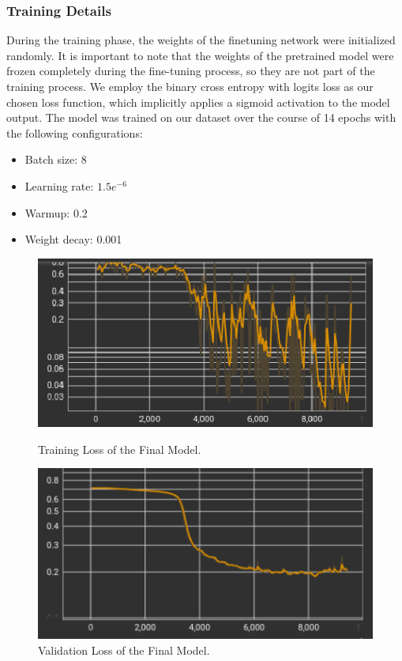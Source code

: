 \documentclass[a4paper,10pt]{report} %
\begin{document}
\subsubsection{Training Details}
During the training phase, the weights of the finetuning network were initialized randomly. It is important to note that the weights of the pretrained model were frozen completely during the fine-tuning process, so they are not part of the training process. We employ the binary cross entropy with logits loss as our chosen loss function, which implicitly applies a sigmoid activation to the model output. The model was trained on our dataset over the course of 14 epochs with the following configurations: 
\begin{itemize}
  \item Batch size: 8
  \item Learning rate: $1.5e^{-6}$
  \item Warmup: 0.2
  \item Weight decay: 0.001
\end{itemize}
\begin{figure}[h]
  \begin{minipage}[b]{0.49\textwidth}
    \centering
    \includegraphics[width=\textwidth]{img/final_model_train_loss.png}
    \caption{Training Loss of the Final Model.}
    \label{fig:final_train_loss}
  \end{minipage}
  \hfill
  \begin{minipage}[b]{0.49\textwidth}
    \centering
    \includegraphics[width=\textwidth]{img/final_model_val_loss.png}
    \caption{Validation Loss of the Final Model.}
    \label{fig:final_valid_loss}
  \end{minipage}
\end{figure}
\end{document}
